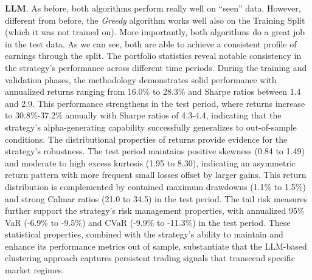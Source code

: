 





\mx
\textbf{LLM}. 
As before, both algorithms perform really well on ``seen'' data. However, different from before, the \textit{Greedy} algorithm works well also on the Training Split (which it was not trained on). More importantly, both algorithms do a great job in the test data. As we can see, both are able to achieve a consistent profile of earnings through the split. 
%
The portfolio statistics 
reveal notable consistency in the strategy's performance across different time periods. During the training and validation phases, the methodology demonstrates solid performance with annualized returns ranging from 16.0\% to 28.3\% and Sharpe ratios between 1.4 and 2.9. This performance strengthens in the test period, where returns increase to 30.8\%-37.2\% annually with Sharpe ratios of 4.3-4.4, indicating that the strategy's alpha-generating capability successfully generalizes to out-of-sample conditions. The distributional properties of returns provide evidence for the strategy's robustness. The test period maintains positive skewness (0.84 to 1.49) and moderate to high excess kurtosis (1.95 to 8.30), indicating an asymmetric return pattern with more frequent small losses offset by larger gains. This return distribution is complemented by contained maximum drawdowns (1.1\% to 1.5\%) and strong Calmar ratios (21.0 to 34.5) in the test period. The tail risk measures further support the strategy's risk management properties, with annualized 95\% VaR (-6.9\% to -9.5\%) and CVaR (-9.9\% to -11.3\%) in the test period. These statistical properties, combined with the strategy's ability to maintain and enhance its performance metrics out of sample, substantiate that the LLM-based clustering approach captures persistent trading signals that transcend specific market regimes.


